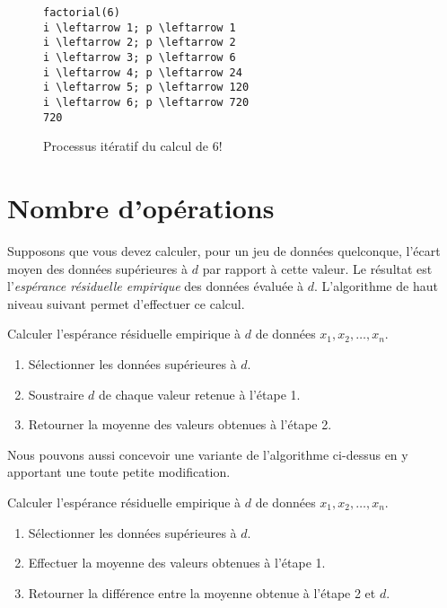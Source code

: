 \begin{figure}
  \centering
  \begin{minipage}{0.25\linewidth}
\begin{Verbatim}[commandchars=\\\{\}]
factorial(6)
i \leftarrow 1; p \leftarrow 1
i \leftarrow 2; p \leftarrow 2
i \leftarrow 3; p \leftarrow 6
i \leftarrow 4; p \leftarrow 24
i \leftarrow 5; p \leftarrow 120
i \leftarrow 6; p \leftarrow 720
720
\end{Verbatim}
  \end{minipage}
  \caption{Processus itératif du calcul de $6!$}
  \label{fig:algorithmes:fact-iter}
\end{figure}


\section{Nombre d'opérations}
\label{sec:algorithmes:bigO}

Supposons que vous devez calculer, pour un jeu de données quelconque,
l'écart moyen des données supérieures à $d$ par rapport à cette
valeur. Le résultat est l'\emph{espérance résiduelle empirique} des
données évaluée à $d$. L'algorithme de haut niveau suivant permet
d'effectuer ce calcul.

\begin{algorithme}
  \label{algo:algorithmes:emrl}
  Calculer l'espérance résiduelle empirique à $d$ de données $x_1, x_2,
  \dots, x_n$.
  \begin{enumerate}
  \item Sélectionner les données supérieures à $d$.
  \item Soustraire $d$ de chaque valeur retenue à l'étape 1.
  \item Retourner la moyenne des valeurs obtenues à l'étape 2.
  \end{enumerate}
\end{algorithme}

Nous pouvons aussi concevoir une variante de l'algorithme ci-dessus en
y apportant une toute petite modification.

\begin{algorithmebis}
  \label{algo:algorithmes:emrl:bis}
  Calculer l'espérance résiduelle empirique à $d$ de données $x_1, x_2,
  \dots, x_n$.
  \begin{enumerate}
  \item Sélectionner les données supérieures à $d$.
  \item Effectuer la moyenne des valeurs obtenues à l'étape 1.
  \item Retourner la différence entre la moyenne obtenue à l'étape 2
    et $d$.
  \end{enumerate}
\end{algorithmebis}


